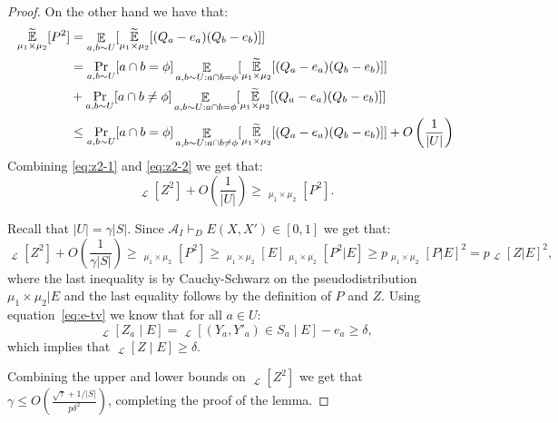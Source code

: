 \documentclass[11pt]{article}
\DeclareMathOperator*{\E}{\mathbb{E}}
\DeclareMathOperator*{\pE}{\widetilde{\mathbb{E}}}
\DeclareMathOperator*{\pPr}{\widetilde{\Pr}}
\def \cA {\mathcal{A}}
\def \cL {\mathcal{L}}
\newcommand{\mitali}[1]{}
\theoremstyle{definition}
\begin{document}
\begin{proof}
On the other hand we have that:
\begin{align}
\pE_{\mu_1 \times \mu_2}[P^2] &= \E_{a,b \sim U}[\pE_{\mu_1 \times \mu_2}[(Q_a - e_a)(Q_b - e_b)]] \notag \\
&= \Pr_{a,b \sim U}[a \cap b = \phi]\E_{a,b \sim U: a\cap b=\phi}[\pE_{\mu_1 \times \mu_2}[(Q_{a} - e_a)(Q_b - e_b)]] \notag \\
&+\Pr_{a,b \sim U}[a \cap b \neq \phi]\E_{a,b \sim U: a\cap b=\phi}[\pE_{\mu_1 \times \mu_2}[(Q_{a} - e_a)(Q_b - e_b)]] \notag \\
&\leq \Pr_{a,b \sim U}[a \cap b = \phi]\E_{a,b \sim U: a\cap b\neq\phi}[\pE_{\mu_1 \times \mu_2}[(Q_{a} - e_a)(Q_b - e_b)]] + O\left(\frac{1}{|U|}\right)\label{eq:z2-2}
\end{align}
Combining \eqref{eq:z2-1} and \eqref{eq:z2-2} we get that:
\[\pE_{\cL}[Z^2]+O\left(\frac{1}{|U|}\right) \geq \pE_{\mu_1 \times \mu_2}[P^2].\]

Recall that $|U| = \gamma |S|$. Since $\cA_I \vdash_{D} E(X,X') \in [0,1]$ we get that:
\[\pE_{\cL}[Z^2]+O\left(\frac{1}{\gamma|S|}\right)  \geq \pE_{\mu_1 \times \mu_2}[P^2] \geq \pE_{\mu_1 \times \mu_2}[E]\pE_{\mu_1 \times \mu_2}[P^2 | E] \geq p \pE_{\mu_1 \times \mu_2}[P | E]^2 = p\pE_{\cL}[Z | E]^2,\]
where the last inequality is by Cauchy-Schwarz on the pseudodistribution $\mu_1 \times \mu_2 | E$ and the last equality follows by the definition of $P$ and $Z$. Using equation~\eqref{eq:e-tv} we know that for all $a \in U$:
\[\pE_{\cL}[Z_a \mid E] = \pPr_{\cL}[(Y_a,Y'_a) \in S_a \mid E] - e_a  \geq \delta,\]
which implies that $\pE_{\cL}[Z \mid E] \geq \delta$.

Combining the upper and lower bounds on $\pE_{\cL}[Z^2]$ we get that $\gamma \leq O\left(\frac{\sqrt{\tau}+ 1/|S|}{p\delta^2}\right)$,
completing the proof of the lemma.







\end{proof}
\end{document}
